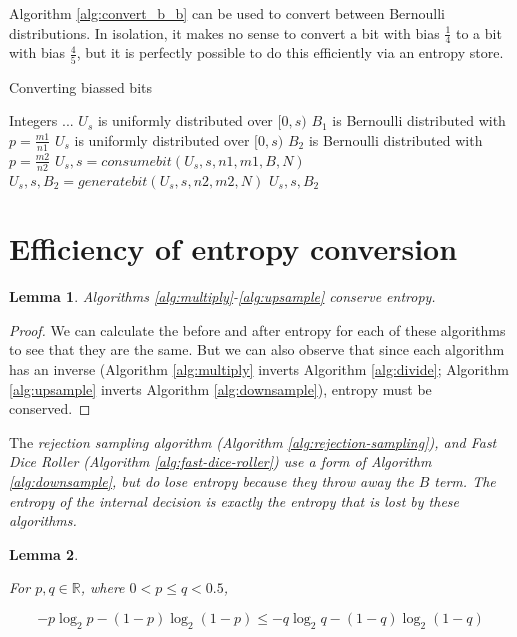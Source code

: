 \documentclass[12pt]{article}
\newtheorem{lemma}{Lemma}
\begin{document}
Algorithm \ref{alg:convert_b_b} can be used to convert between Bernoulli distributions. In isolation, it makes no sense to convert a bit with bias $\frac{1}{4}$ to a bit with bias $\frac{4}{5}$, but it is perfectly possible to do this efficiently via an entropy store.

\begin{algorithm}
\caption{Converting biassed bits}
\label{alg:convert_b_b}
\begin{algorithmic}[1]
    \Require Integers ...
    \Require $U_s$ is uniformly distributed over $[0,s)$
    \Require $B_1$ is Bernoulli distributed with $p=\frac{m1}{n1}$
    \Ensure $U_s$ is uniformly distributed over $[0,s)$
    \Ensure $B_2$ is Bernoulli distributed with $p=\frac{m2}{n2}$
    \State $U_s, s = consumebit(U_s, s, n1, m1, B, N)$
    \State $U_s, s, B_2 = generatebit(U_s, s, n2, m2, N)$
    \State \Return $U_s, s, B_2$
\EndProcedure
\end{algorithmic}
\end{algorithm}






\section {Efficiency of entropy conversion}

\begin{lemma}
\label{lem:conservation}
Algorithms \ref{alg:multiply}-\ref{alg:upsample} conserve entropy.
\end{lemma}

\begin{proof}
We can calculate the before and after entropy for each of these algorithms to see that they are the same. But we can also observe that since each algorithm has an inverse (Algorithm \ref{alg:multiply} inverts Algorithm \ref{alg:divide}; Algorithm \ref{alg:upsample} inverts Algorithm \ref{alg:downsample}), entropy must be conserved.
\end{proof}

The \em rejection sampling \em algorithm (Algorithm \ref{alg:rejection-sampling}), and Fast Dice Roller (Algorithm \ref{alg:fast-dice-roller}) use a form of Algorithm \ref{alg:downsample}, but do lose entropy because they throw away the $B$ term. The entropy of the internal decision is exactly the entropy that is lost by these algorithms.

\begin{lemma}
    \label{lem:shannon-inequality}

For $p,q \in \mathbb{R}$, where $0 < p\le q < 0.5$, 

\begin{equation}
-p\log_2 p - (1-p)\log_2(1-p) \le -q\log_2 q - (1-q)\log_2(1-q)
\end{equation}
\end{lemma}
\end{document}
